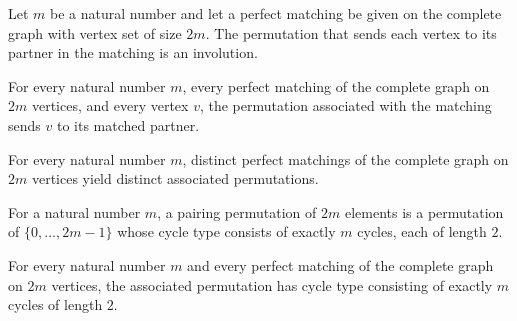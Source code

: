\begin{definition}
\label{FABL.perfectMatchingPartnerPerm}
\leanok
{}
Let $m$ be a natural number and let a perfect matching be given on the complete graph
with vertex set of size $2m$. The permutation that sends each vertex to its partner in
the matching is an involution.
\end{definition}

\begin{theorem}
\label{FABL.perfectMatchingPartnerPerm_apply}
\leanok
{}
For every natural number $m$, every perfect matching of the complete graph on $2m$
vertices, and every vertex $v$, the permutation associated with the matching sends $v$
to its matched partner.
\end{theorem}

\begin{theorem}
\label{FABL.perfectMatchingPartnerPerm_injective}
\leanok
{}
For every natural number $m$, distinct perfect matchings of the complete graph on $2m$
vertices yield distinct associated permutations.
\end{theorem}

\begin{definition}
\label{FABL.PairingPerm}
\leanok
For a natural number $m$, a pairing permutation of $2m$ elements is a permutation of
$\{0,\ldots,2m-1\}$ whose cycle type consists of exactly $m$ cycles, each of length $2$.
\end{definition}

\begin{theorem}
\label{FABL.perfectMatchingPartnerPerm_cycleType}
\leanok
{}
For every natural number $m$ and every perfect matching of the complete graph on $2m$
vertices, the associated permutation has cycle type consisting of exactly $m$ cycles of
length $2$.
\end{theorem}

